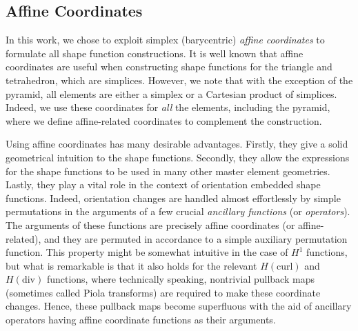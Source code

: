 
\subsection{Affine Coordinates}
\label{sec:affinecoordinates}

In this work, we chose to exploit simplex (barycentric) \textit{affine coordinates} to formulate all shape function constructions. %
It is well known that affine coordinates are useful when constructing shape functions for the triangle and tetrahedron, which are simplices.
However, we note that with the exception of the pyramid, all elements are either a simplex or a Cartesian product of simplices. 
Indeed, we use these coordinates for \textit{all} the elements, including the pyramid, where we define affine-related coordinates to complement the construction.

Using affine coordinates has many desirable advantages.
Firstly, they give a solid geometrical intuition to the shape functions.
Secondly, they allow the expressions for the shape functions to be used in many other master element geometries.
Lastly, they play a vital role in the context of orientation embedded shape functions.
Indeed, orientation changes are handled almost effortlessly by simple permutations in the arguments of a few crucial \textit{ancillary functions} (or \textit{operators}).
The arguments of these functions are precisely affine coordinates (or affine-related), and they are permuted in accordance to a simple auxiliary permutation function.
This property might be somewhat intuitive in the case of $H^1$ functions, but what is remarkable is that it also holds for the relevant $H(\mathrm{curl})$ and $H(\mathrm{div})$ functions, where technically speaking, nontrivial pullback maps (sometimes called Piola transforms) are required to make these coordinate changes.
Hence, these pullback maps become superfluous with the aid of ancillary operators having affine coordinate functions as their arguments.

